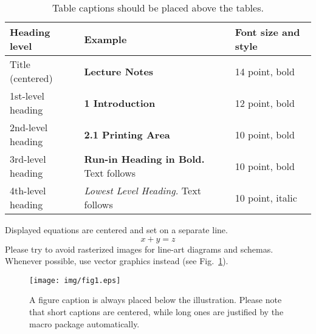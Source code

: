 \documentclass[runningheads]{llncs}
\begin{document}
\begin{table}
  \caption{Table captions should be placed above the
    tables.}\label{tab1}
  \begin{tabular}{|l|l|l|}
    \hline
    Heading level     & Example                                          & Font size and style \\
    \hline
    Title (centered)  & {\Large\bfseries Lecture Notes}                  & 14 point, bold      \\
    1st-level heading & {\large\bfseries 1 Introduction}                 & 12 point, bold      \\
    2nd-level heading & {\bfseries 2.1 Printing Area}                    & 10 point, bold      \\
    3rd-level heading & {\bfseries Run-in Heading in Bold.} Text follows & 10 point, bold      \\
    4th-level heading & {\itshape Lowest Level Heading.} Text follows    & 10 point, italic    \\
    \hline
  \end{tabular}
\end{table}


\noindent Displayed equations are centered and set on a separate
line.
\begin{equation}
  x + y = z
\end{equation}
Please try to avoid rasterized images for line-art diagrams and
schemas. Whenever possible, use vector graphics instead (see
Fig.~\ref{fig1}).

\begin{figure}
  \texttt{[image: img/fig1.eps]}
  \caption{A figure caption is always placed below the illustration.
    Please note that short captions are centered, while long ones are
    justified by the macro package automatically.} \label{fig1}
\end{figure}
\end{document}
